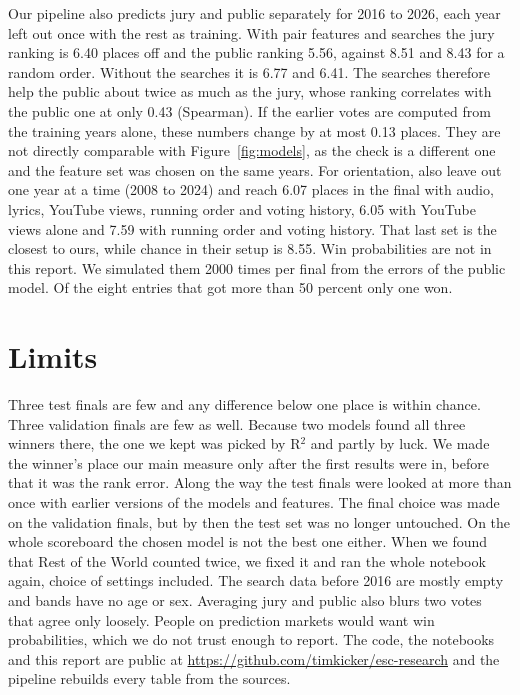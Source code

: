 Our pipeline also predicts jury and public separately for 2016 to 2026, each year left out once with the rest as training. With pair features and searches the jury ranking is 6.40 places off and the public ranking 5.56, against 8.51 and 8.43 for a random order. Without the searches it is 6.77 and 6.41. The searches therefore help the public about twice as much as the jury, whose ranking correlates with the public one at only 0.43 (Spearman). If the earlier votes are computed from the training years alone, these numbers change by at most 0.13 places. They are not directly comparable with Figure~\ref{fig:models}, as the check is a different one and the feature set was chosen on the same years. For orientation, \citet{adamska2025} also leave out one year at a time (2008 to 2024) and reach 6.07 places in the final with audio, lyrics, YouTube views, running order and voting history, 6.05 with YouTube views alone and 7.59 with running order and voting history. That last set is the closest to ours, while chance in their setup is 8.55. Win probabilities are not in this report. We simulated them 2000 times per final from the errors of the public model. Of the eight entries that got more than 50 percent only one won.

\section{Limits}

Three test finals are few and any difference below one place is within chance. Three validation finals are few as well. Because two models found all three winners there, the one we kept was picked by R$^2$ and partly by luck. We made the winner's place our main measure only after the first results were in, before that it was the rank error. Along the way the test finals were looked at more than once with earlier versions of the models and features. The final choice was made on the validation finals, but by then the test set was no longer untouched. On the whole scoreboard the chosen model is not the best one either. When we found that Rest of the World counted twice, we fixed it and ran the whole notebook again, choice of settings included. The search data before 2016 are mostly empty and bands have no age or sex. Averaging jury and public also blurs two votes that agree only loosely. People on prediction markets would want win probabilities, which we do not trust enough to report. The code, the notebooks and this report are public at \url{https://github.com/timkicker/esc-research} and the pipeline rebuilds every table from the sources.

